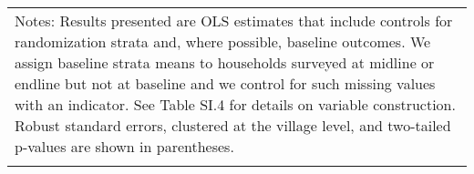 \begin{longtable}{llcccccccccc}
\hline \hline                                                                                                                                                                                                                                                                                                                                                                                                                                                                                                                                                                                                                                                                                                                                                                                                                                                                             
\multicolumn{12}{p{\textwidth}}{{Notes: Results presented are OLS estimates that include controls for randomization strata and, where possible, baseline outcomes. We assign baseline strata means to households surveyed at midline or endline but not at baseline and we control for such missing values with an indicator. See Table SI.4 for details on variable construction. Robust standard errors, clustered at the village level, and two-tailed p-values are shown in parentheses. }} \\                                                                                                                                                                                                                                                                                                                                                                                        
\multicolumn{12}{p{\textwidth}}{{}} \\                                                                                                                                                                                                                                                                                                                                                                                                                                                                                                                                                                                                                                                                                                                                                                                                                                                    

\end{longtable}
